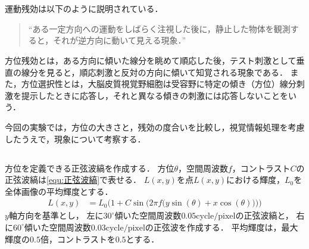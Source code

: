 \chapter{\kadaic}
\section{\purpose}
運動残効は以下のように説明されている．
\begin{quote}
    ``ある一定方向への運動をしばらく注視した後に，静止した物体を観測すると，それが逆方向に動いて見える現象．''\\
    \hfill\cite[p.58]{認知心理学辞典}
\end{quote}
方位残効とは，ある方向に傾いた線分を眺めて順応した後，テスト刺激として垂直の線分を見ると，順応刺激と反対の方向に傾いて知覚される現象である\cite[p.5]{方位残効と運動残効のメカニズム}．
また，方位選択性とは，大脳皮質視覚野細胞は受容野に特定の傾き（方位）線分刺激を提示したときに応答し，それと異なる傾きの刺激には応答しないことをいう\cite[p.764]{認知心理学辞典}．\par
今回の実験では，方位の大きさと，残効の度合いを比較し，視覚情報処理を考慮したうえで，現象について考察する．
\section{\method}
\paragraph{\kadaica}
方位を定義できる正弦波縞を作成する．
方位\(\theta\)，空間周波数\(f\)，コントラスト\(C\)の正弦波縞は\eqref{equ:正弦波縞}で表せる．
\(L(x,y)\)を点\(L(x,y)\)における輝度，\(L_0\)を全体画像の平均輝度とする．
\begin{align}
    L(x,y) & = L_0\Bigg(1+C\sin\Big(2\pi f\big(y\sin(\theta)+x\cos(\theta)\big)\Big)\Bigg)\label{equ:正弦波縞}
\end{align}
\(y\)軸方向を基準とし，
左に\(30^\circ\)傾いた空間周波数\(0.05\textrm{cycle}/\textrm{pixel}\)の正弦波縞と，
右に\(60^{\circ}\)傾いた空間周波数\(0.03\textrm{cycle}/\textrm{pixel}\)の正弦波を作成する．
平均輝度は，最大輝度の\(0.5\)倍，コントラストを\(0.5\)とする．
